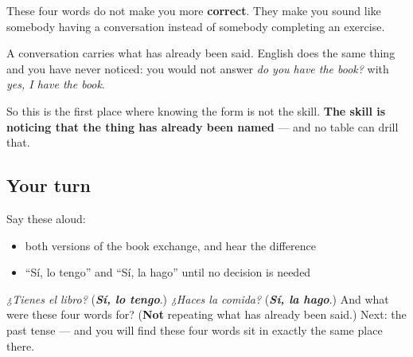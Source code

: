 \begin{grammarlens}[title={Grammar Lens: what the pronoun is actually for}]
These four words do not make you more \textbf{correct}. They make you sound like somebody having a conversation instead of somebody completing an exercise.

A conversation carries what has already been said. English does the same thing and you have never noticed: you would not answer \emph{do you have the book?} with \emph{yes, I have the book}.

So this is the first place where knowing the form is not the skill. \textbf{The skill is noticing that the thing has already been named} — and no table can drill that.
\end{grammarlens}

\subsection*{Your turn}
Say these aloud:

\begin{itemize}
\raggedright
  \item both versions of the book exchange, and hear the difference
  \item \textquotedblleft{}Sí, lo tengo\textquotedblright{} and \textquotedblleft{}Sí, la hago\textquotedblright{} until no decision is needed
\end{itemize}

\begin{tcolorbox}[breakable,colback=teal!4,colframe=teal!35!black,title={Before you move on}]
\emph{¿Tienes el libro?} (\emph{\textbf{Sí, lo tengo}}.) \emph{¿Haces la comida?} (\emph{\textbf{Sí, la hago}}.) And what were these four words for? (\textbf{Not} repeating what has already been said.) Next: the past tense — and you will find these four words sit in exactly the same place there.
\end{tcolorbox}
